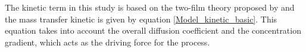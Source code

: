 \documentclass[../Article_Model_Parameters.tex]{subfiles}
\begin{document}
	
	The kinetic term in this study is based on the two-film theory proposed by \citet{Reverchon1996} and the mass transfer kinetic is given by equation \ref{Model_kinetic_basic}. This equation takes into account the overall diffusion coefficient and the concentration gradient, which acts as the driving force for the process.
	
	
\end{document}
